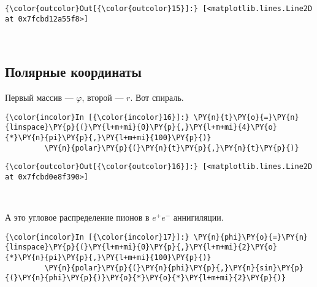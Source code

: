             \begin{Verbatim}[commandchars=\\\{\}]
{\color{outcolor}Out[{\color{outcolor}15}]:} [<matplotlib.lines.Line2D at 0x7fcbd12a55f8>]
\end{Verbatim}
        
    \begin{center}
    \end{center}
    { \hspace*{\fill} \\}
    
\subsection{Полярные координаты}
\label{matplotlib3}

Первый массив --- \(\varphi\), второй --- \(r\). Вот спираль.

    \begin{Verbatim}[commandchars=\\\{\}]
{\color{incolor}In [{\color{incolor}16}]:} \PY{n}{t}\PY{o}{=}\PY{n}{linspace}\PY{p}{(}\PY{l+m+mi}{0}\PY{p}{,}\PY{l+m+mi}{4}\PY{o}{*}\PY{n}{pi}\PY{p}{,}\PY{l+m+mi}{100}\PY{p}{)}
         \PY{n}{polar}\PY{p}{(}\PY{n}{t}\PY{p}{,}\PY{n}{t}\PY{p}{)}
\end{Verbatim}

            \begin{Verbatim}[commandchars=\\\{\}]
{\color{outcolor}Out[{\color{outcolor}16}]:} [<matplotlib.lines.Line2D at 0x7fcbd0e8f390>]
\end{Verbatim}
        
    \begin{center}
    \end{center}
    { \hspace*{\fill} \\}
    
    А это угловое распределение пионов в \(e^+ e^-\) аннигиляции.

    \begin{Verbatim}[commandchars=\\\{\}]
{\color{incolor}In [{\color{incolor}17}]:} \PY{n}{phi}\PY{o}{=}\PY{n}{linspace}\PY{p}{(}\PY{l+m+mi}{0}\PY{p}{,}\PY{l+m+mi}{2}\PY{o}{*}\PY{n}{pi}\PY{p}{,}\PY{l+m+mi}{100}\PY{p}{)}
         \PY{n}{polar}\PY{p}{(}\PY{n}{phi}\PY{p}{,}\PY{n}{sin}\PY{p}{(}\PY{n}{phi}\PY{p}{)}\PY{o}{*}\PY{o}{*}\PY{l+m+mi}{2}\PY{p}{)}
\end{Verbatim}

